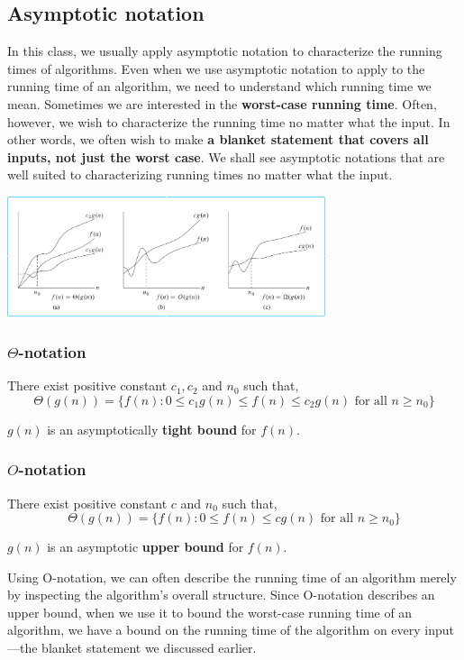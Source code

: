 \documentclass[en,hazy,blue,screen,14pt]{elegantnote}
\begin{document}
\subsection{Asymptotic notation }

In this class, we usually apply asymptotic notation to characterize
the running times of algorithms. Even when we use asymptotic notation
to apply to the running time of an algorithm, we need to understand
which running time we mean. Sometimes we are interested in the \textbf{worst-case
running time}. Often, however, we wish to characterize the running
time no matter what the input. In other words, we often wish to make
\textbf{a blanket statement that covers all inputs, not just the worst
case}. We shall see asymptotic notations that are well suited to characterizing
running times no matter what the input.

\centerline{\includegraphics[width=0.7\textwidth]{asymptotic-notion}}

\subsubsection*{$\Theta$-notation}
There exist positive constant $c_{1},c_{2}$ and $n_{0}$ such that,
\[
\Theta(g(n))=\{f(n): 0\le c_{1}g(n)\le f(n)\le c_{2}g(n)\text{ for all 
}n\ge n_{0}\}
\]

$g(n)$ is an asymptotically \textbf{tight bound} for $f(n)$.

\subsubsection*{$O$-notation}
There exist positive constant $c$ and $n_{0}$ such that,
\[
\Theta(g(n))=\{f(n):0\le f(n)\le cg(n)\text{ for all }n\ge n_{0}\}
\]

$g(n)$ is an asymptotic \textbf{upper bound} for $f(n)$.

Using O-notation, we can often describe the running time of an algorithm
merely by inspecting the algorithm\textquoteright s overall structure.
Since O-notation describes an upper bound, when we use it to bound
the worst-case running time of an algorithm, we have a bound on the
running time of the algorithm on every input---the blanket statement
we discussed earlier. 
\end{document}
